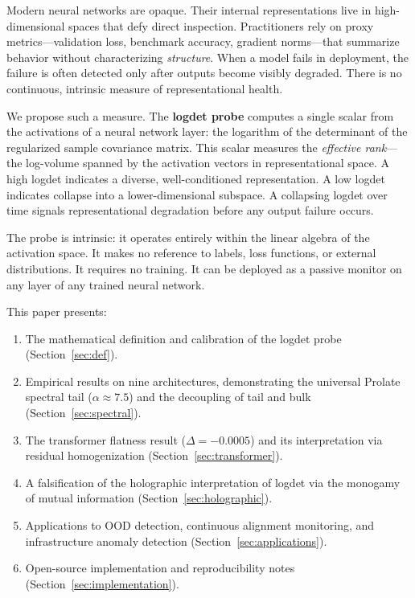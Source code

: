 \documentclass[12pt,a4paper]{article}
\begin{document}
Modern neural networks are opaque. Their internal representations live in high-dimensional spaces that defy direct inspection. Practitioners rely on proxy metrics---validation loss, benchmark accuracy, gradient norms---that summarize behavior without characterizing \textit{structure}. When a model fails in deployment, the failure is often detected only after outputs become visibly degraded. There is no continuous, intrinsic measure of representational health.

We propose such a measure. The \textbf{logdet probe} computes a single scalar from the activations of a neural network layer: the logarithm of the determinant of the regularized sample covariance matrix. This scalar measures the \textit{effective rank}---the log-volume spanned by the activation vectors in representational space. A high logdet indicates a diverse, well-conditioned representation. A low logdet indicates collapse into a lower-dimensional subspace. A collapsing logdet over time signals representational degradation before any output failure occurs.

The probe is intrinsic: it operates entirely within the linear algebra of the activation space. It makes no reference to labels, loss functions, or external distributions. It requires no training. It can be deployed as a passive monitor on any layer of any trained neural network.

This paper presents:
\begin{enumerate}
    \item The mathematical definition and calibration of the logdet probe (Section~\ref{sec:def}).
    \item Empirical results on nine architectures, demonstrating the universal Prolate spectral tail ($\alpha \approx 7.5$) and the decoupling of tail and bulk (Section~\ref{sec:spectral}).
    \item The transformer flatness result ($\Delta = -0.0005$) and its interpretation via residual homogenization (Section~\ref{sec:transformer}).
    \item A falsification of the holographic interpretation of logdet via the monogamy of mutual information (Section~\ref{sec:holographic}).
    \item Applications to OOD detection, continuous alignment monitoring, and infrastructure anomaly detection (Section~\ref{sec:applications}).
    \item Open-source implementation and reproducibility notes (Section~\ref{sec:implementation}).
\end{enumerate}
\end{document}
